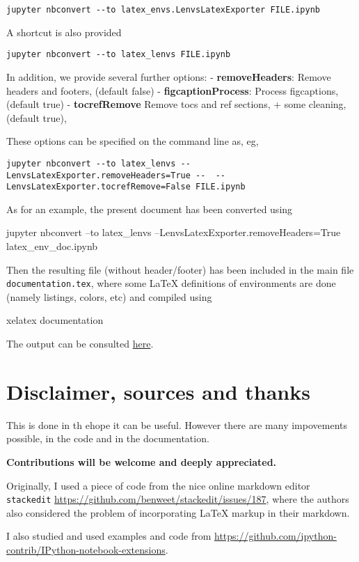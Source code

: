 \begin{verbatim}
jupyter nbconvert --to latex_envs.LenvsLatexExporter FILE.ipynb
\end{verbatim}

A shortcut is also provided

\begin{verbatim}
jupyter nbconvert --to latex_lenvs FILE.ipynb
\end{verbatim}

In addition, we provide several further options: -
\textbf{removeHeaders}: Remove headers and footers, (default false) -
\textbf{figcaptionProcess}: Process figcaptions, (default true) -
\textbf{tocrefRemove} Remove tocs and ref sections, + some cleaning,
(default true),

These options can be specified on the command line as, eg,

\begin{verbatim}
jupyter nbconvert --to latex_lenvs --LenvsLatexExporter.removeHeaders=True --  --LenvsLatexExporter.tocrefRemove=False FILE.ipynb
\end{verbatim}

    \begin{example}
As for an example, the present document has
been converted using
 
 jupyter nbconvert --to latex\_lenvs
--LenvsLatexExporter.removeHeaders=True latex\_env\_doc.ipynb


Then the resulting file (without header/footer) has been included in
the main file \texttt{documentation.tex}, where some LaTeX definitions
of environments are done (namely listings, colors, etc) and compiled
using 
 
 xelatex documentation
 
The output can be
consulted \href{documentation.pdf}{here}. 
\end{example}

    \section{Disclaimer, sources and
thanks}\label{disclaimer-sources-and-thanks}

    This is done in th ehope it can be useful. However there are many
impovements possible, in the code and in the documentation.

\textbf{Contributions will be welcome and deeply appreciated.}

Originally, I used a piece of code from the nice online markdown editor
\texttt{stackedit}
\url{https://github.com/benweet/stackedit/issues/187}, where the authors
also considered the problem of incorporating LaTeX markup in their
markdown.

I also studied and used examples and code from
\url{https://github.com/ipython-contrib/IPython-notebook-extensions}.

    